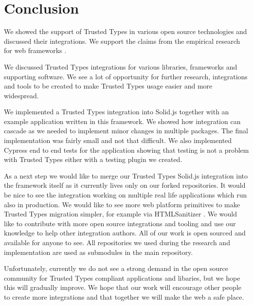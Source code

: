 \chapter{Conclusion}


We showed the support of Trusted Types in various open source technologies and discussed their
integrations. We support the claims from the empirical research for web frameworks
\cite{tt_web_framework_paper}.

We discussed Trusted Types integrations for various libraries, frameworks and supporting software.
We see a lot of opportunity for further research, integrations and tools to be created to make
Trusted Types usage easier and more widespread.

We implemented a Trusted Types integration into Solid.js together with an example application
written in this framework. We showed how integration can cascade as we needed to implement minor
changes in multiple packages. The final implementation was fairly small and not that difficult. We
also implemented Cypress end to end tests for the application showing that testing is not a problem
with Trusted Types either with a testing plugin we created.

As a next step we would like to merge our Trusted Types Solid.js integration into the framework
itself as it currently lives only on our forked repositories. It would be nice to see the
integration working on multiple real life applications which run also in production. We would like
to see more web platform primitives to make Trusted Types migration simpler, for example via
HTMLSanitizer \cite{tt_report_mid2021}. We would like to contribute with more open source
integrations and tooling and use our knowledge to help other integration authors. All of our work is
open sourced and available for anyone to see. All repositories we used during the research and
implementation are used as submodules in the main repository.

Unfortunately, currently we do not see a strong demand in the open source community for Trusted
Types compliant applications and libaries, but we hope this will gradually improve. We hope that our
work will encourage other people to create more integrations and that together we will make the web
a safe place.
